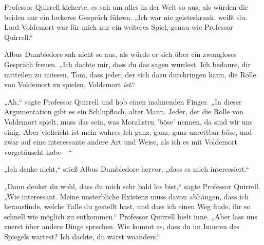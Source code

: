 Professor Quirrell kicherte, es sah um alles in der Welt so aus, als würden die beiden nur ein lockeres Gespräch führen.
„Ich war nie geisteskrank, weißt du. Lord Voldemort war für mich nur ein weiteres Spiel, genau wie Professor Quirrell.“

Albus Dumbledore sah nicht so aus, als würde er sich über ein zwangloses Gespräch freuen. „Ich dachte mir, dass du das sagen würdest. Ich bedaure, dir mitteilen zu müssen, Tom, dass jeder, der sich dazu durchringen kann, die Rolle von Voldemort zu spielen, Voldemort \emph{ist}.“

„Ah,“ sagte Professor Quirrell und hob einen mahnenden Finger. „In dieser Argumentation gibt es ein Schlupfloch, alter Mann. Jeder, der die Rolle von Voldemort spielt, muss das sein, was Moralisten 'böse' nennen, da sind wir uns einig. Aber vielleicht ist mein wahres Ich ganz, ganz, ganz unrettbar böse, und zwar auf eine interessante andere Art und Weise, als ich es mit Voldemort vorgetäuscht habe—“

„Ich denke nicht,“ stieß Albus Dumbledore hervor, „dass es mich interessiert.“

„Dann denkst du wohl, dass du mich sehr bald los bist,“ sagte Professor Quirrell. „Wie interessant. Meine unsterbliche Existenz muss davon abhängen, dass ich herausfinde, welche Falle du gestellt hast, und dass ich einen Weg finde, ihr so schnell wie möglich zu entkommen.“ Professor Quirrell hielt inne. „Aber lass uns zuerst über andere Dinge sprechen. Wie kommt es, dass du im Inneren des Spiegels wartest? Ich dachte, du wärst woanders.“

